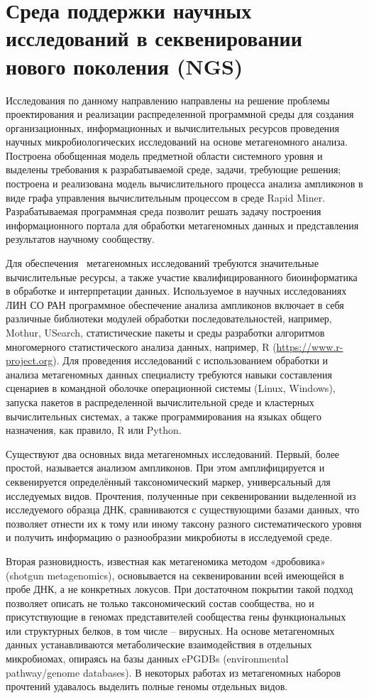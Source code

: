 \documentclass[a4paper,12pt,openany,final]{extreport}
\begin{document}
\chapter{Среда поддержки научных исследований в секвенировании
нового поколения (NGS)}\label{chap:5}\label{do:cherk}

Исследования по данному направлению направлены на решение проблемы
проектирования и реализации распределенной программной среды для
создания организационных, информационных и вычислительных ресурсов
проведения научных микробиологических исследований на основе
метагеномного анализа. Построена обобщенная модель предметной области
системного уровня и выделены требования к разрабатываемой среде, задачи,
требующие решения; построена и реализована модель вычислительного
процесса анализа ампликонов в виде графа управления вычислительным
процессом в среде Rapid Miner. Разрабатываемая программная среда
позволит решать задачу построения информационного портала для обработки
метагеномных данных и представления результатов научному сообществу.

Для обеспечения~ метагеномных исследований требуются значительные
вычислительные ресурсы, а также участие квалифицированного
биоинформатика в обработке и интерпретации данных. Используемое в
научных исследованиях ЛИН СО РАН программное обеспечение анализа
ампликонов включает в себя различные библиотеки модулей обработки
последовательностей, например, Mothur, USearch, статистические пакеты и
среды разработки алгоритмов многомерного статистического анализа данных,
например, R
(\href{https://www.r-project.org/}{{https://www.r-project.org}}). Для
проведения исследований с использованием обработки и анализа
метагеномных данных специалисту требуются навыки составления сценариев в
командной оболочке операционной системы (Linux, Windows), запуска
пакетов в распределенной вычислительной среде и кластерных
вычислительных системах, а также программирования на языках общего
назначения, как правило, R или Python.

Существуют два основных вида метагеномных исследований. Первый, более
простой, называется анализом ампликонов. При этом амплифицируется и
секвенируется определённый таксономический маркер, универсальный для
исследуемых видов. Прочтения, полученные при секвенировании выделенной
из исследуемого образца ДНК, сравниваются с существующими базами данных,
что позволяет отнести их к тому или иному таксону разного
систематического уровня и получить информацию о разнообразии микробиоты
в исследуемой среде.

Вторая разновидность, известная как метагеномика методом «дробовика»
(shotgun metagenomics), основывается на секвенировании всей имеющейся в
пробе ДНК, а не конкретных локусов. При достаточном покрытии такой
подход позволяет описать не только таксономический состав сообщества, но
и присутствующие в геномах представителей сообщества гены функциональных
или структурных белков, в том числе -- вирусных. На основе метагеномных
данных устанавливаются метаболические взаимодействия в отдельных
микробиомах, опираясь на базы данных ePGDBs (environmental
pathway/genome databases). В некоторых работах из метагеномных наборов
прочтений удавалось выделить полные геномы отдельных видов.
\end{document}
